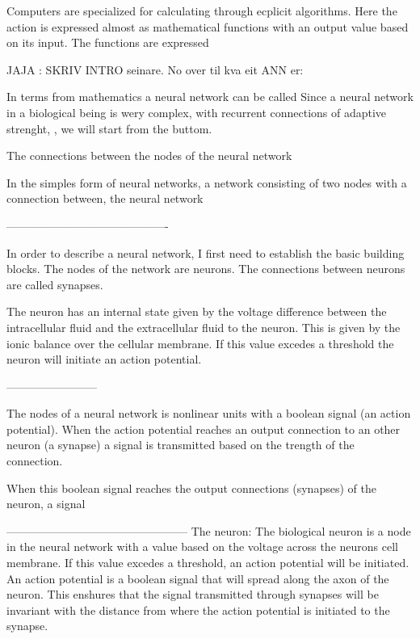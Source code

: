 
Computers are specialized for calculating through ecplicit algorithms. Here the action is expressed almost as mathematical functions with an output value based on its input. 
The functions are expressed 

JAJA : SKRIV INTRO seinare. No over til kva eit ANN er:

In terms from mathematics a neural network can be called 
Since a neural network in a biological being is wery complex, with recurrent connections of adaptive strenght, %
, we will start from the buttom. 

The connections between the nodes of the neural network

In the simples form of neural networks, a network consisting of two nodes with a connection between, the neural network 



-------------------------------------------

In order to describe a neural network, I first need to establish the basic building blocks. The nodes of the network are neurons. The connections between neurons are called synapses.

The neuron has an internal state given by the voltage difference between the intracellular fluid and the extracellular fluid to the neuron. This is given by the ionic balance over the cellular membrane. 
If this value excedes a threshold the neuron will initiate an action potential.  

------------------------


The nodes of a neural network is nonlinear units with a boolean signal (an action potential). 
When the action potential reaches an output connection to an other neuron (a synapse) a signal is transmitted based on the trength of the connection. 

When this boolean signal reaches the output connections (synapses) of the neuron, a signal 


------------------------------------------------
The neuron:
The biological neuron is a node in the neural network with a value based on the voltage across the neurons cell membrane. If this value excedes a threshold, an action potential will be initiated. 
An action potential is a boolean signal that will spread along the axon of the neuron. 
This enshures that the signal transmitted through synapses will be invariant with the distance from where the action potential is initiated to the synapse.

